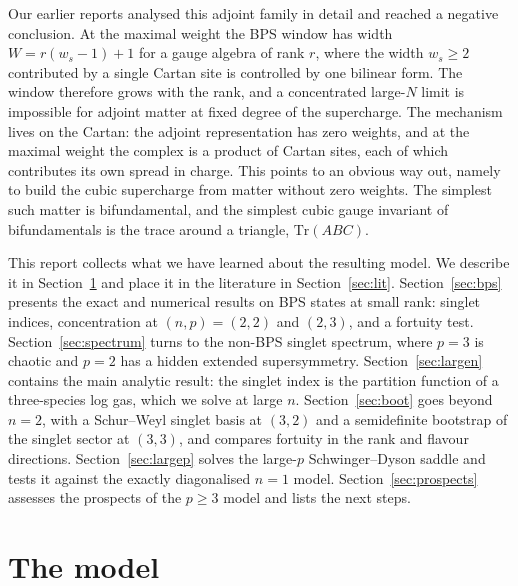 \documentclass[10pt]{article}
\newcommand{\Tr}{\mathrm{Tr}}
\begin{document}
Our earlier reports \cite{R1,R2} analysed this adjoint family in detail and reached a negative conclusion. At the
maximal weight the BPS window has width $W=r(w_s-1)+1$ for a gauge algebra of rank $r$, where the width $w_s\ge2$
contributed by a single Cartan site is controlled by one bilinear form. The window therefore grows with the rank,
and a concentrated large-$N$ limit is impossible for adjoint matter at fixed degree of the supercharge. The
mechanism lives on the Cartan: the adjoint representation has zero weights, and at the maximal weight the complex
is a product of Cartan sites, each of which contributes its own spread in charge. This points to an obvious way
out, namely to build the cubic supercharge from matter without zero weights. The simplest such matter is
bifundamental, and the simplest cubic gauge invariant of bifundamentals is the trace around a triangle,
$\Tr(ABC)$.

This report collects what we have learned about the resulting model. We describe it in Section~\ref{sec:model} and
place it in the literature in Section~\ref{sec:lit}. Section~\ref{sec:bps} presents the exact and numerical results
on BPS states at small rank: singlet indices, concentration at $(n,p)=(2,2)$ and $(2,3)$, and a fortuity test.
Section~\ref{sec:spectrum} turns to the non-BPS singlet spectrum, where $p=3$ is chaotic and $p=2$ has a hidden
extended supersymmetry. Section~\ref{sec:largen} contains the main analytic result: the singlet index is the
partition function of a three-species log gas, which we solve at large $n$. Section~\ref{sec:boot} goes beyond
$n=2$, with a Schur--Weyl singlet basis at $(3,2)$ and a semidefinite bootstrap of the singlet sector at $(3,3)$,
and compares fortuity in the rank and flavour directions. Section~\ref{sec:largep} solves the large-$p$
Schwinger--Dyson saddle and tests it against the exactly diagonalised $n=1$ model.
Section~\ref{sec:prospects} assesses the prospects of the $p\ge3$ model and lists the next steps.

\section{The model}\label{sec:model}
\end{document}
